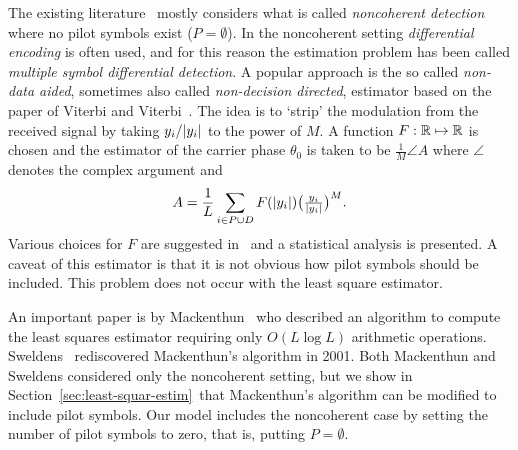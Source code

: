 \documentclass[draftcls, onecolumn, 11pt]{IEEEtran}
\begin{document}
The existing literature~\cite{Mackenthun1994,Cowley_ref_sym_carr_1998,ViterbiViterbi_phase_est_1983,Sweldens2001,Wilson1989,Makrakis1990,Liu1991} mostly considers what is called \emph{noncoherent detection} where no pilot symbols exist ($P = \emptyset$).  In the noncoherent setting \emph{differential encoding} is often used, and for this reason the estimation problem has been called \emph{multiple symbol differential detection}.  A popular approach is the so called \emph{non-data aided}, sometimes also called \emph{non-decision directed}, estimator based on the paper of Viterbi and Viterbi~\cite{ViterbiViterbi_phase_est_1983}.  The idea is to `strip' the modulation from the received signal by taking $y_i / {\left\vert y_i \right\vert}$ to the power of $M$.  A function $F: {\mathbb R} \mapsto {\mathbb R}$ is chosen and the estimator of the carrier phase $\theta_0$ is taken to be $\tfrac{1}{M}\angle{A}$ where $\angle$ denotes the complex argument and
\begin{equation}\label{eq:viterbiviterbi}
A = \frac{1}{L}\sum_{i \in P \cup D} F({\left\vert y_i \right\vert}) \big(\tfrac{y_i}{{\left\vert y_i \right\vert}}\big)^M.
\end{equation}
Various choices for $F$ are suggested in~\cite{ViterbiViterbi_phase_est_1983} and a statistical analysis is presented.  A caveat of this estimator is that it is not obvious how pilot symbols should be included. %
This problem does not occur with the least square estimator.

An important paper is by Mackenthun~\cite{Mackenthun1994} who described an algorithm to compute the least squares estimator requiring only $O(L \log L)$ arithmetic operations.  Sweldens~\cite{Sweldens2001} rediscovered Mackenthun's algorithm in 2001.  Both Mackenthun and Sweldens considered only the noncoherent setting, but we show in Section~\ref{sec:least-squar-estim}~that Mackenthun's algorithm can be modified to include pilot symbols. Our model includes the noncoherent case by setting the number of pilot symbols to zero, that is, putting $P = \emptyset$.  
\end{document}
